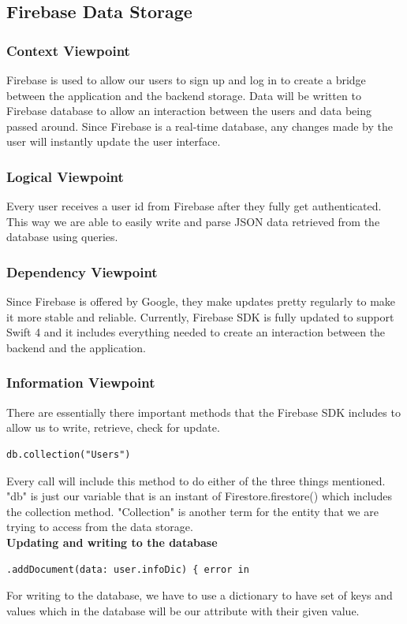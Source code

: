 \documentclass[onecolumn, draftclsnofoot,10pt, compsoc]{IEEEtran}
\begin{document}
\subsection{Firebase Data Storage}
\subsubsection{Context Viewpoint}
Firebase is used to allow our users to sign up and log in to create a bridge between the application and the backend storage. Data will be written to Firebase database to allow an interaction between the users and data being passed around. Since Firebase is a real-time database, any changes made by the user will instantly update the user interface.

\subsubsection{Logical Viewpoint}
Every user receives a user id from Firebase after they fully get authenticated. This way we are able to easily write and parse JSON data retrieved from the database using queries.

\subsubsection{Dependency Viewpoint}
Since Firebase is offered by Google, they make updates pretty regularly to make it more stable and reliable. Currently, Firebase SDK is fully updated to support Swift 4 and it includes everything needed to create an interaction between the backend and the application.
\subsubsection{Information Viewpoint}
There are essentially there important methods that the Firebase SDK includes to allow us to write, retrieve, check for update.
\begin{lstlisting}
db.collection("Users")
\end{lstlisting}
Every call will include this method to do either of the three things mentioned. "db" is just our variable that is an instant of Firestore.firestore()  which includes the collection method. "Collection" is another term for the entity that we are trying to access from the data storage. \\
\noindent\textbf{Updating and writing to the database}
\begin{lstlisting}
.addDocument(data: user.infoDic) { error in
\end{lstlisting}
For writing to the database, we have to use a dictionary to have set of keys and values which in the database will be our attribute with their given value.
\end{document}
